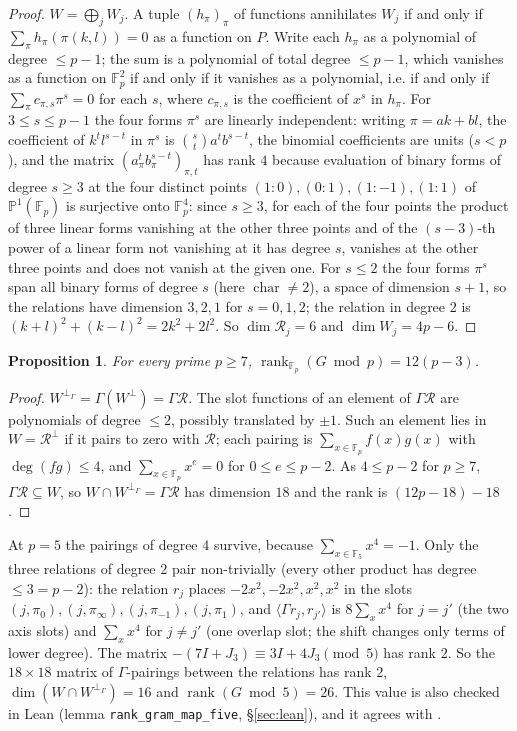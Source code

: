 \documentclass[11pt]{article}
\newtheorem{proposition}[theorem]{Proposition}
\theoremstyle{definition}
\theoremstyle{remark}
\newcommand{\F}{\mathbb{F}}
\newcommand{\Pp}{\mathbb{P}}
\begin{document}
\begin{proof}
$W=\bigoplus_jW_j$. A tuple $(h_\pi)_\pi$ of functions annihilates $W_j$ if and only if $\sum_\pi h_\pi(\pi(k,l))=0$ as a function on $P$. Write each $h_\pi$ as a polynomial of degree $\le p-1$; the sum is a polynomial of total degree $\le p-1$, which vanishes as a function on $\F_p^2$ if and only if it vanishes as a polynomial, i.e. if and only if $\sum_\pi c_{\pi,s}\pi^s=0$ for each $s$, where $c_{\pi,s}$ is the coefficient of $x^s$ in $h_\pi$. For $3\le s\le p-1$ the four forms $\pi^s$ are linearly independent: writing $\pi=ak+bl$, the coefficient of $k^tl^{s-t}$ in $\pi^s$ is $\binom st a^tb^{s-t}$, the binomial coefficients are units ($s<p$), and the matrix $(a_\pi^tb_\pi^{s-t})_{\pi,t}$ has rank $4$ because evaluation of binary forms of degree $s\ge3$ at the four distinct points $(1:0),(0:1),(1:-1),(1:1)$ of $\Pp^1(\F_p)$ is surjective onto $\F_p^4$: since $s\ge3$, for each of the four points the product of three linear forms vanishing at the other three points and of the $(s-3)$-th power of a linear form not vanishing at it has degree $s$, vanishes at the other three points and does not vanish at the given one. For $s\le2$ the four forms $\pi^s$ span all binary forms of degree $s$ (here $\operatorname{char}\neq2$), a space of dimension $s+1$, so the relations have dimension $3,2,1$ for $s=0,1,2$; the relation in degree $2$ is $(k+l)^2+(k-l)^2=2k^2+2l^2$. So $\dim \mathcal R_j=6$ and $\dim W_j=4p-6$.
\end{proof}

\begin{proposition}\label{prop:rank}
For every prime $p\ge7$, $\operatorname{rank}_{\F_p}(G\bmod p)=12(p-3)$.
\end{proposition}

\begin{proof}
$W^{\perp_\Gamma}=\Gamma(W^\perp)=\Gamma \mathcal R$. The slot functions of an element of $\Gamma \mathcal R$ are polynomials of degree $\le2$, possibly translated by $\pm1$. Such an element lies in $W=\mathcal R^\perp$ if it pairs to zero with $\mathcal R$; each pairing is $\sum_{x\in\F_p}f(x)g(x)$ with $\deg(fg)\le4$, and $\sum_{x\in\F_p}x^e=0$ for $0\le e\le p-2$. As $4\le p-2$ for $p\ge7$, $\Gamma \mathcal R\subseteq W$, so $W\cap W^{\perp_\Gamma}=\Gamma \mathcal R$ has dimension $18$ and the rank is $(12p-18)-18$.
\end{proof}

At $p=5$ the pairings of degree $4$ survive, because $\sum_{x\in\F_5}x^4=-1$. Only the three relations of degree $2$ pair non-trivially (every other product has degree $\le3=p-2$): the relation $r_j$ places $-2x^2,-2x^2,x^2,x^2$ in the slots $(j,\pi_0),(j,\pi_\infty),(j,\pi_{-1}),(j,\pi_1)$, and $\langle\Gamma r_j,r_{j'}\rangle$ is $8\sum_xx^4$ for $j=j'$ (the two axis slots) and $\sum_xx^4$ for $j\neq j'$ (one overlap slot; the shift changes only terms of lower degree). The matrix $-(7I+J_3)\equiv3I+4J_3\pmod5$ has rank $2$. So the $18\times18$ matrix of $\Gamma$-pairings between the relations has rank $2$, $\dim(W\cap W^{\perp_\Gamma})=16$ and $\operatorname{rank}(G\bmod5)=26$. This value is also checked in Lean (lemma \texttt{rank\_gram\_map\_five}, \S\ref{sec:lean}), and it agrees with \cite[Table~1, row $(2,5)$]{AMV}.
\end{document}
